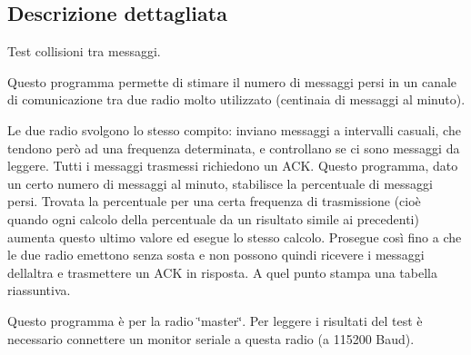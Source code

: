 \subsection{Descrizione dettagliata}
Test collisioni tra messaggi. 

Questo programma permette di stimare il numero di messaggi persi in un canale di comunicazione tra due radio molto utilizzato (centinaia di messaggi al minuto).

Le due radio svolgono lo stesso compito\+: inviano messaggi a intervalli casuali, che tendono però ad una frequenza determinata, e controllano se ci sono messaggi da leggere. Tutti i messaggi trasmessi richiedono un A\+CK. Questo programma, dato un certo numero di messaggi al minuto, stabilisce la percentuale di messaggi persi. Trovata la percentuale per una certa frequenza di trasmissione (cioè quando ogni calcolo della percentuale da un risultato simile ai precedenti) aumenta questo ultimo valore ed esegue lo stesso calcolo. Prosegue così fino a che le due radio emettono senza sosta e non possono quindi ricevere i messaggi dell\textquotesingle{}altra e trasmettere un A\+CK in risposta. A quel punto stampa una tabella riassuntiva.

Questo programma è per la radio \char`\"{}master\char`\"{}. Per leggere i risultati del test è necessario connettere un monitor seriale a questa radio (a 115200 Baud). 